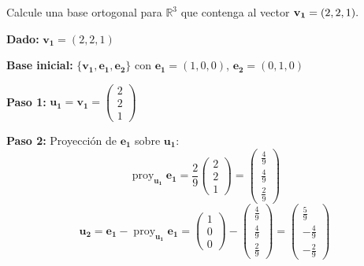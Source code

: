 \begin{prob} 
Calcule una base ortogonal para $\mathbb{R}^3$ que contenga al vector ${\bf{v_1}}=(2,2,1).$
\begin{myproof}
\textbf{Dado:} $\mathbf{v_1} = (2, 2, 1)$

\textbf{Base inicial:} $\{\mathbf{v_1}, \mathbf{e_1}, \mathbf{e_2}\}$ con $\mathbf{e_1} = (1,0,0)$, $\mathbf{e_2} = (0,1,0)$

\textbf{Paso 1:}  
$\mathbf{u_1} = \mathbf{v_1} = \begin{pmatrix} 2 \\ 2 \\ 1 \end{pmatrix}$

\textbf{Paso 2:}  
Proyección de $\mathbf{e_1}$ sobre $\mathbf{u_1}$:
\[
\operatorname{proy}_{\mathbf{u_1}} \mathbf{e_1} = \frac{2}{9} \begin{pmatrix} 2 \\ 2 \\ 1 \end{pmatrix} = \begin{pmatrix} \frac{4}{9} \\ \frac{4}{9} \\ \frac{2}{9} \end{pmatrix}
\]
\[
\mathbf{u_2} = \mathbf{e_1} - \operatorname{proy}_{\mathbf{u_1}} \mathbf{e_1} = \begin{pmatrix} 1 \\ 0 \\ 0 \end{pmatrix} - \begin{pmatrix} \frac{4}{9} \\ \frac{4}{9} \\ \frac{2}{9} \end{pmatrix} = \begin{pmatrix} \frac{5}{9} \\ -\frac{4}{9} \\ -\frac{2}{9} \end{pmatrix}
\]


\end{myproof}
\end{prob}

